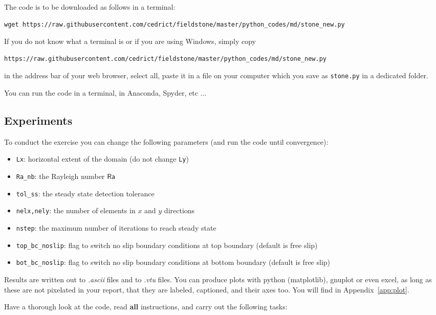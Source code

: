 The code is to be downloaded as follows in a terminal:
{\small
\begin{verbatim}
wget https://raw.githubusercontent.com/cedrict/fieldstone/master/python_codes/md/stone_new.py
\end{verbatim}
}
If you do not know what a terminal is or if you are using Windows, simply copy 
{\small
\begin{verbatim}
https://raw.githubusercontent.com/cedrict/fieldstone/master/python_codes/md/stone_new.py
\end{verbatim}
}
in the address bar of your web browser, select all, paste it in a file on your computer which 
you save as {\tt stone.py} in a dedicated folder.

You can run the code in a terminal, in Anaconda, Spyder, etc ... 

\subsection{Experiments}

To conduct the exercise you can change the following parameters (and run the code until convergence):
\begin{itemize}
\item {\tt Lx}: horizontal extent of the domain (do not change {\tt Ly})
\item {\tt Ra\_nb}: the Rayleigh number ${\mathsf{Ra}}$
\item {\tt tol\_ss}: the steady state detection tolerance
\item {\tt nelx,nely}: the number of elements in $x$ and $y$ directions 
\item {\tt nstep}: the maximum number of iterations to reach steady state
\item {\tt top\_bc\_noslip}: flag to switch no slip boundary conditions at top boundary (default is free slip)
\item {\tt bot\_bc\_noslip}: flag to switch no slip boundary conditions at 
      bottom boundary (default is free slip)
\end{itemize}

Results are written out to {\sl .ascii} files and to {\sl .vtu} files. You can produce 
plots with python (matplotlib), gnuplot or even excel, as long as these are not pixelated in your report, 
that they are labeled, captioned, and their axes too.  
You will find in Appendix~\ref{app:plot}.


Have a thorough look at the code, read {\bf all} instructions, and carry out the following tasks:

